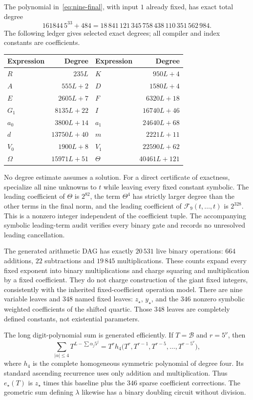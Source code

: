 The polynomial in~\eqref{eq:nine-final}, with input $1$ already fixed,
has exact total degree
\[
 \boxed{161844\,5^{33}+484
   =18\,841\,121\,345\,758\,438\,110\,351\,562\,984.}
\]
The following ledger gives selected exact degrees; all compiler and
index constants are coefficients.
\begin{center}
\begin{tabular}{lr@{\qquad}lr}
Expression & Degree & Expression & Degree\\\hline
$R$ & $235L$ & $K$ & $950L+4$\\
$A$ & $555L+2$ & $D$ & $1580L+4$\\
$E$ & $2605L+7$ & $F$ & $6320L+18$\\
$G_1$ & $8135L+22$ & $I$ & $16740L+46$\\
$a_0$ & $3800L+14$ & $a_1$ & $24640L+68$\\
$d$ & $13750L+40$ & $m$ & $2221L+11$\\
$V_0$ & $1900L+8$ & $V_1$ & $22590L+62$\\
$\Omega$ & $15971L+51$ & $\Theta$ & $40461L+121$
\end{tabular}
\end{center}
No degree estimate assumes a solution.  For a direct certificate of
exactness, specialize all nine unknowns to $t$ while leaving every
fixed constant symbolic.  The leading coefficient of $\Theta$ is
$2^{82}$, the term $\Theta^4$ has strictly larger degree than the
other terms in the final norm, and the leading coefficient of
$\mathcal F_9(t,\ldots,t)$ is $2^{328}$.
This is a nonzero integer independent of the coefficient tuple.
The accompanying symbolic leading-term audit verifies every binary
gate and records no unresolved leading cancellation.

The generated arithmetic DAG has exactly $20\,531$ live binary
operations: $664$ additions, $22$ subtractions and $19\,845$
multiplications.  These counts expand every fixed exponent into
binary multiplications and charge squaring and multiplication by a
fixed coefficient.  They do not charge construction of the giant
fixed integers, consistently with the inherited fixed-coefficient
operation model.  There are nine variable leaves and $348$ named
fixed leaves: $z_\star$, $y_\star$, and the $346$ nonzero symbolic
weighted coefficients of the shifted quartic.  Those $348$ leaves
are completely defined constants, not existential parameters.

The long digit-polynomial sum is generated efficiently.  If
$T=\mathcal B$ and $r=5^\nu$, then
\[
 \sum_{|\alpha|\leq4}T^{L-\sum\alpha_j5^j}
 =T^r h_4\bigl(T^r,T^{r-1},T^{r-5},\ldots,T^{r-5^\nu}\bigr),
\]
where $h_4$ is the complete homogeneous symmetric polynomial of
degree four.  Its standard ascending recurrence uses only addition
and multiplication.  Thus $e_\star(T)$ is $z_\star$ times this
baseline plus the $346$ sparse coefficient corrections.
The geometric sum defining $\lambda$ likewise has a binary
doubling circuit without division.

